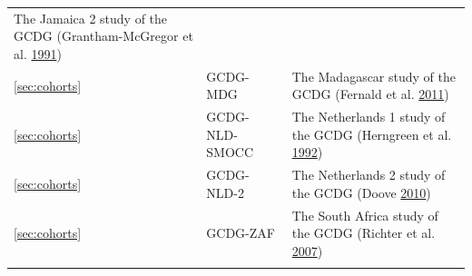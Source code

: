 \documentclass[
]{book}
\begin{document}
\begin{longtable}[]{@{}lll@{}}
\begin{minipage}[t]{0.61\columnwidth}
The Jamaica 2 study of the GCDG (Grantham-McGregor et al. \protect\hyperlink{ref-Grantham-McGregor1991}{1991})\strut
\end{minipage}\tabularnewline
\begin{minipage}[t]{0.12\columnwidth}\raggedright
\ref{sec:cohorts}\strut
\end{minipage} & \begin{minipage}[t]{0.19\columnwidth}\raggedright
GCDG-MDG\strut
\end{minipage} & \begin{minipage}[t]{0.61\columnwidth}\raggedright
The Madagascar study of the GCDG (Fernald et al. \protect\hyperlink{ref-Fernald2011}{2011})\strut
\end{minipage}\tabularnewline
\begin{minipage}[t]{0.12\columnwidth}\raggedright
\ref{sec:cohorts}\strut
\end{minipage} & \begin{minipage}[t]{0.19\columnwidth}\raggedright
GCDG-NLD-SMOCC\strut
\end{minipage} & \begin{minipage}[t]{0.61\columnwidth}\raggedright
The Netherlands 1 study of the GCDG (Herngreen et al. \protect\hyperlink{ref-herngreen1992}{1992})\strut
\end{minipage}\tabularnewline
\begin{minipage}[t]{0.12\columnwidth}\raggedright
\ref{sec:cohorts}\strut
\end{minipage} & \begin{minipage}[t]{0.19\columnwidth}\raggedright
GCDG-NLD-2\strut
\end{minipage} & \begin{minipage}[t]{0.61\columnwidth}\raggedright
The Netherlands 2 study of the GCDG (Doove \protect\hyperlink{ref-doove2010}{2010})\strut
\end{minipage}\tabularnewline
\begin{minipage}[t]{0.12\columnwidth}\raggedright
\ref{sec:cohorts}\strut
\end{minipage} & \begin{minipage}[t]{0.19\columnwidth}\raggedright
GCDG-ZAF\strut
\end{minipage} & \begin{minipage}[t]{0.61\columnwidth}\raggedright
The South Africa study of the GCDG (Richter et al. \protect\hyperlink{ref-Richter2007}{2007})\strut
\end{minipage}\tabularnewline
\begin{minipage}[t]{0.12\columnwidth}\raggedright

\end{minipage}
\end{longtable}
\end{document}
